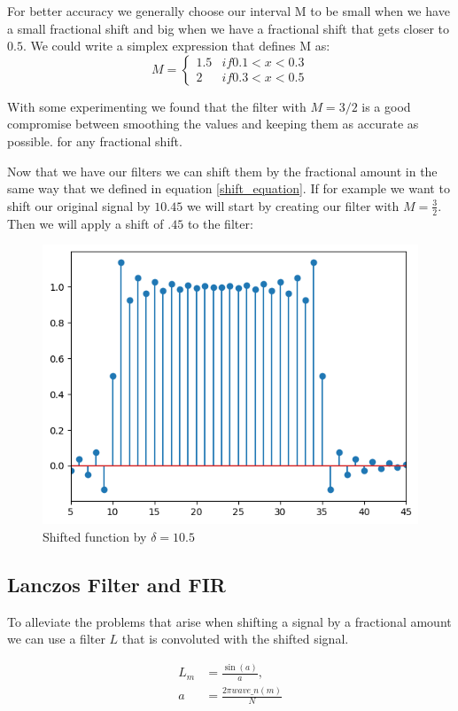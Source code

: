 \documentclass[]{usiinfbachelorproject}
\begin{document}
	For better accuracy we generally choose our interval M to be small when we have a small fractional shift and big when we have a fractional shift that gets closer to $0.5$. We could write a simplex expression that defines M as:
	\begin{equation*}
		M = 
		\begin{cases}
			1.5 & if 0.1 < x < 0.3\\
			2 & if 0.3 < x < 0.5
		\end{cases}
	\end{equation*}
	
	With some experimenting we found that the filter with $M=3/2$ is a good compromise between smoothing the values and keeping them as accurate as possible. for any fractional shift. 
	
	
	Now that we have our filters we can shift them by the fractional amount in the same way that we defined in equation \ref{shift_equation}. If for example we want to shift our original signal by $10.45$ we will start by creating our filter with $M=\frac{3}{2}$. Then we will apply a shift of $.45$ to the filter:
	
	\iffalse

	
	\begin{figure}[h]
		\centering
		\includegraphics[width=0.5\columnwidth]{images/box_shifted_delta10_1_n50.png}
		\caption{Shifted function by $\delta=10.5$}
	\end{figure}
	
	\subsection{Lanczos Filter and FIR}
	To alleviate the problems that arise when shifting a signal by a fractional amount we can use a filter $L$ that is convoluted with the shifted signal.
	
	\begin{align*}
		L_m &= \frac{\sin(a)}{a},\\
		a &= \frac{2\pi wave\_n(m)}{N}
	\end{align*}
	
\end{document}
